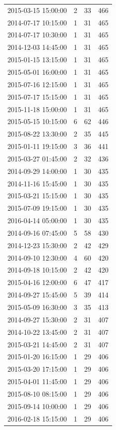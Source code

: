\begin{tabular}{lrrr}
2015-03-15 15:00:00 & 2 & 33 & 466 \\
2014-07-17 10:15:00 & 1 & 31 & 465 \\
2014-07-17 10:30:00 & 1 & 31 & 465 \\
2014-12-03 14:45:00 & 1 & 31 & 465 \\
2015-01-15 13:15:00 & 1 & 31 & 465 \\
2015-05-01 16:00:00 & 1 & 31 & 465 \\
2015-07-16 12:15:00 & 1 & 31 & 465 \\
2015-07-17 15:15:00 & 1 & 31 & 465 \\
2015-11-18 15:00:00 & 1 & 31 & 465 \\
2015-05-15 10:15:00 & 6 & 62 & 446 \\
2015-08-22 13:30:00 & 2 & 35 & 445 \\
2015-01-11 19:15:00 & 3 & 36 & 441 \\
2015-03-27 01:45:00 & 2 & 32 & 436 \\
2014-09-29 14:00:00 & 1 & 30 & 435 \\
2014-11-16 15:45:00 & 1 & 30 & 435 \\
2015-03-21 15:15:00 & 1 & 30 & 435 \\
2015-07-09 19:15:00 & 1 & 30 & 435 \\
2016-04-14 05:00:00 & 1 & 30 & 435 \\
2014-09-16 07:45:00 & 5 & 58 & 430 \\
2014-12-23 15:30:00 & 2 & 42 & 429 \\
2014-09-10 12:30:00 & 4 & 60 & 420 \\
2014-09-18 10:15:00 & 2 & 42 & 420 \\
2015-04-16 12:00:00 & 6 & 47 & 417 \\
2014-09-27 15:45:00 & 5 & 39 & 414 \\
2015-05-09 16:30:00 & 3 & 35 & 413 \\
2014-09-27 15:30:00 & 2 & 31 & 407 \\
2014-10-22 13:45:00 & 2 & 31 & 407 \\
2015-03-21 14:45:00 & 2 & 31 & 407 \\
2015-01-20 16:15:00 & 1 & 29 & 406 \\
2015-03-20 17:15:00 & 1 & 29 & 406 \\
2015-04-01 11:45:00 & 1 & 29 & 406 \\
2015-08-10 08:15:00 & 1 & 29 & 406 \\
2015-09-14 10:00:00 & 1 & 29 & 406 \\
2016-02-18 15:15:00 & 1 & 29 & 406 \\

\end{tabular}
